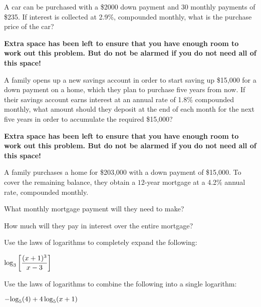 \documentclass[11pt]{exam}
\begin{document}
\begin{questions}
\question[3] A car can be purchased with a \$2000 down payment and $30$ monthly payments of \$235.  If interest is collected at 2.9\%, compounded monthly, what is the purchase price of the car?

\textbf{Extra space has been left to ensure that you have enough room to work out this problem.  But do not be alarmed if you do not need all of this space!}
\newpage

\question[3] A family opens up a new savings account in order to start saving up \$15,000 for a down payment on a home, which they plan to purchase five years from now.  If their savings account earns interest at an annual rate of 1.8\% compounded monthly, what amount should they deposit at the end of each month for the next five years in order to accumulate the required \$15,000?

\textbf{Extra space has been left to ensure that you have enough room to work out this problem.  But do not be alarmed if you do not need all of this space!}
\newpage

\question[4] A family purchases a home for \$203,000 with a down payment of \$15,000.  To cover the remaining balance, they obtain a $12$-year mortgage at a 4.2\% annual rate, compounded monthly.
\begin{compactenum}[(a)]
\item What monthly mortgage payment will they need to make?
\vspace{10cm}

\item How much will they pay in interest over the entire mortgage?
\end{compactenum}
\newpage

\question[2] Use the laws of logarithms to completely expand the following:
\begin{center}
$\displaystyle{\log_{3}\left[\frac{(x+1)^3}{x-3}\right]}$
\end{center}
\vspace{8cm}

\question[2] Use the laws of logarithms to combine the following into a single logarithm:
\begin{center}
$-\displaystyle{\log_{5}(4) + 4\log_{5}(x + 1)}$
\end{center}
\end{questions}
\end{document}
